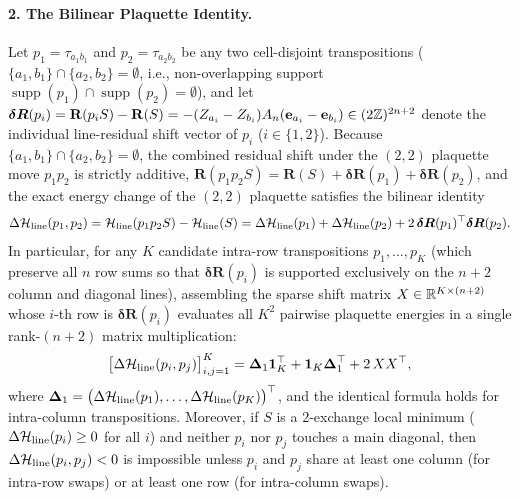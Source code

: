 \begin{theorem}
\paragraph{2. The Bilinear Plaquette Identity.}
Let $p_1 = \tau_{a_1 b_1}$ and $p_2 = \tau_{a_2 b_2}$ be any two cell-disjoint transpositions ($\{a_1, b_1\} \cap \{a_2, b_2\} = \emptyset$, i.e., non-overlapping support $\operatorname{supp}(p_1)\cap\operatorname{supp}(p_2)=\emptyset$), and let $\boldsymbol{\delta R}(p_i) = \mathbf{R}(p_i S) - \mathbf{R}(S) = -(Z_{a_i} - Z_{b_i}) A_n(\mathbf{e}_{a_i} - \mathbf{e}_{b_i}) \in (2\mathbb{Z})^{2n+2}$ denote the individual line-residual shift vector of $p_i$ ($i \in \{1,2\}$). Because $\{a_1, b_1\} \cap \{a_2, b_2\} = \emptyset$, the combined residual shift under the $(2,2)$ plaquette move $p_1 p_2$ is strictly additive, $\mathbf{R}(p_1 p_2 S) = \mathbf{R}(S) + \boldsymbol{\delta R}(p_1) + \boldsymbol{\delta R}(p_2)$, and the exact energy change of the $(2,2)$ plaquette satisfies the bilinear identity
\begin{equation}
  \Delta\mathcal{H}_{\mathrm{line}}(p_1, p_2) = \mathcal{H}_{\mathrm{line}}(p_1 p_2 S) - \mathcal{H}_{\mathrm{line}}(S) = \Delta\mathcal{H}_{\mathrm{line}}(p_1) + \Delta\mathcal{H}_{\mathrm{line}}(p_2) + 2\,\boldsymbol{\delta R}(p_1)^\top \boldsymbol{\delta R}(p_2).
  \label{eq:bilinear_plaquette_identity}
\end{equation}
In particular, for any $K$ candidate intra-row transpositions $p_1,\dots,p_K$ (which preserve all $n$ row sums so that $\boldsymbol{\delta R}(p_i)$ is supported exclusively on the $n+2$ column and diagonal lines), assembling the sparse shift matrix $X \in \mathbb{R}^{K \times (n+2)}$ whose $i$-th row is $\boldsymbol{\delta R}(p_i)$ evaluates all $K^2$ pairwise plaquette energies in a single rank-$(n+2)$ matrix multiplication:
\begin{equation}
  \bigl[\Delta\mathcal{H}_{\mathrm{line}}(p_i, p_j)\bigr]_{i,j=1}^K = \boldsymbol{\Delta}_1 \mathbf{1}_K^\top + \mathbf{1}_K \boldsymbol{\Delta}_1^\top + 2\,X X^\top,
  \label{eq:blas_plaquette_matrix}
\end{equation}
where $\boldsymbol{\Delta}_1 = \bigl(\Delta\mathcal{H}_{\mathrm{line}}(p_1),\dots,\Delta\mathcal{H}_{\mathrm{line}}(p_K)\bigr)^\top$, and the identical formula holds for intra-column transpositions. Moreover, if $S$ is a $2$-exchange local minimum ($\Delta\mathcal{H}_{\mathrm{line}}(p_i) \ge 0$ for all $i$) and neither $p_i$ nor $p_j$ touches a main diagonal, then $\Delta\mathcal{H}_{\mathrm{line}}(p_i, p_j) < 0$ is impossible unless $p_i$ and $p_j$ share at least one column (for intra-row swaps) or at least one row (for intra-column swaps).


\end{theorem}
